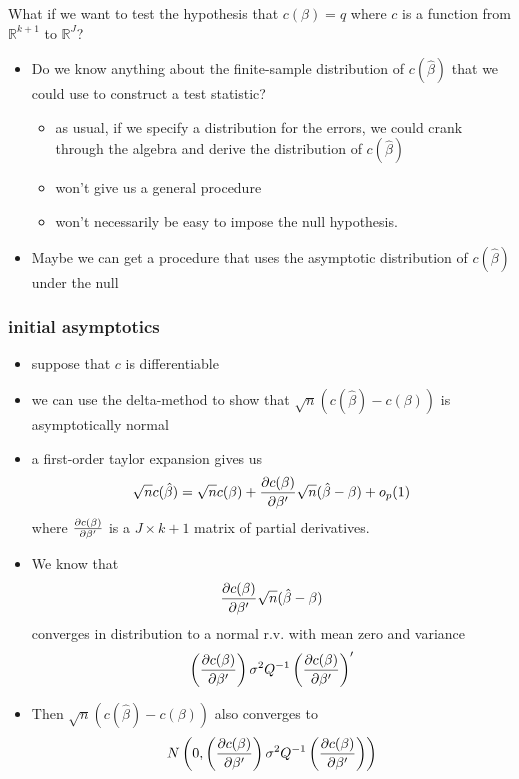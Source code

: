 \documentclass[11pt]{article}
\begin{document}
      What if we want to test the hypothesis that $c(\beta) = q$ where
      $c$ is a function from $\mathbb{R}^{k+1}$ to $\mathbb{R}^J$?
\begin{itemize}
\item Do we know anything about the finite-sample distribution of
        $c(\hat\beta)$ that we could use to construct a test statistic?
\begin{itemize}
\item as usual, if we specify a distribution for the errors, we
          could crank through the algebra and derive the distribution of
          $c(\hat\beta)$
\item won't give us a general procedure
\item won't necessarily be easy to impose the null hypothesis.
\end{itemize}
\item Maybe we can get a procedure that uses the asymptotic
        distribution of $c(\hat\beta)$ under the null
\end{itemize}
\subsubsection{initial asymptotics}
\label{sec-3-2-2}

\begin{itemize}
\item suppose that $c$ is differentiable
\item we can use the delta-method to show that
        $\sqrt{n}(c(\hat\beta) - c(\beta))$ is asymptotically normal
\item a first-order taylor expansion gives us
        \[ \sqrt{n} c(\hat\beta) = \sqrt{n} c(\beta) +
        {\partial c(\beta) \over \partial \beta'} \sqrt{n} (\hat\beta -
        \beta) + o_p(1) \]
        where $\partial c(\beta) \over \partial \beta'$ is a $J \times
        k+1$ matrix of partial derivatives.
\item We know that \[{\partial c(\beta) \over \partial \beta'}
        \sqrt{n} (\hat\beta - \beta)\] converges in distribution to a
        normal r.v. with mean zero and variance \[ \left({\partial
        c(\beta) \over \partial \beta'}\right) \sigma^2 Q^{-1}
        \left({\partial c(\beta) \over \partial \beta'}\right)'\]
\item Then $\sqrt{n} (c(\hat\beta) - c(\beta))$ also converges to \[
        N\left(0, \left({\partial
        c(\beta) \over \partial \beta'}\right) \sigma^2 Q^{-1}
        \left({\partial c(\beta) \over \partial \beta'}\right) \right)\]
\end{itemize}
\end{document}
